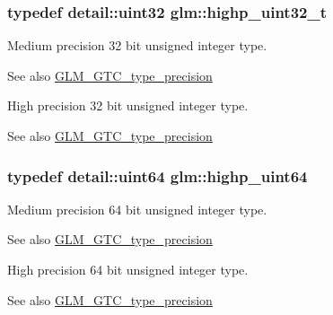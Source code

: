 \subsubsection[{highp\+\_\+uint32\+\_\+t}]{\setlength{\rightskip}{0pt plus 5cm}typedef {\bf detail\+::uint32} {\bf glm\+::highp\+\_\+uint32\+\_\+t}}\label{group__gtc__type__precision_ga8eb85ad460079c63b68866ae34637bda}
Medium precision 32 bit unsigned integer type. \begin{DoxySeeAlso}{See also}
\hyperlink{group__gtc__type__precision}{G\+L\+M\+\_\+\+G\+T\+C\+\_\+type\+\_\+precision}
\end{DoxySeeAlso}
High precision 32 bit unsigned integer type. \begin{DoxySeeAlso}{See also}
\hyperlink{group__gtc__type__precision}{G\+L\+M\+\_\+\+G\+T\+C\+\_\+type\+\_\+precision} 
\end{DoxySeeAlso}
\hypertarget{group__gtc__type__precision_ga8079c653e20cda03d34b99de629a7b09}{}
\subsubsection[{highp\+\_\+uint64}]{\setlength{\rightskip}{0pt plus 5cm}typedef detail\+::uint64 {\bf glm\+::highp\+\_\+uint64}}\label{group__gtc__type__precision_ga8079c653e20cda03d34b99de629a7b09}
Medium precision 64 bit unsigned integer type. \begin{DoxySeeAlso}{See also}
\hyperlink{group__gtc__type__precision}{G\+L\+M\+\_\+\+G\+T\+C\+\_\+type\+\_\+precision}
\end{DoxySeeAlso}
High precision 64 bit unsigned integer type. \begin{DoxySeeAlso}{See also}
\hyperlink{group__gtc__type__precision}{G\+L\+M\+\_\+\+G\+T\+C\+\_\+type\+\_\+precision} 
\end{DoxySeeAlso}
\hypertarget{group__gtc__type__precision_ga6e66f40c5909bfc872b068187fa6029e}{}

